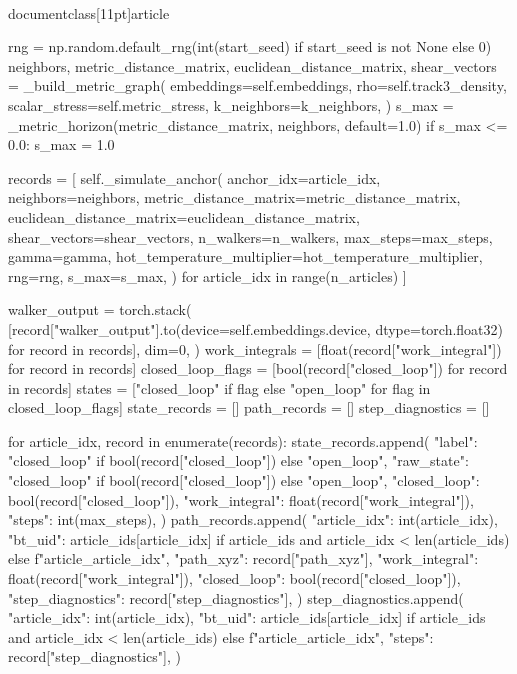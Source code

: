 \\documentclass[11pt]{article}
\begin{document}
\begin{CodeBlock}
        rng = np.random.default_rng(int(start_seed) if start_seed is not None else 0)
        neighbors, metric_distance_matrix, euclidean_distance_matrix, shear_vectors = _build_metric_graph(
            embeddings=self.embeddings,
            rho=self.track3_density,
            scalar_stress=self.metric_stress,
            k_neighbors=k_neighbors,
        )
        s_max = _metric_horizon(metric_distance_matrix, neighbors, default=1.0)
        if s_max <= 0.0:
            s_max = 1.0

        records = [
            self._simulate_anchor(
                anchor_idx=article_idx,
                neighbors=neighbors,
                metric_distance_matrix=metric_distance_matrix,
                euclidean_distance_matrix=euclidean_distance_matrix,
                shear_vectors=shear_vectors,
                n_walkers=n_walkers,
                max_steps=max_steps,
                gamma=gamma,
                hot_temperature_multiplier=hot_temperature_multiplier,
                rng=rng,
                s_max=s_max,
            )
            for article_idx in range(n_articles)
        ]

        walker_output = torch.stack(
            [record["walker_output"].to(device=self.embeddings.device, dtype=torch.float32) for record in records],
            dim=0,
        )
        work_integrals = [float(record["work_integral"]) for record in records]
        closed_loop_flags = [bool(record["closed_loop"]) for record in records]
        states = ["closed_loop" if flag else "open_loop" for flag in closed_loop_flags]
        state_records = []
        path_records = []
        step_diagnostics = []

        for article_idx, record in enumerate(records):
            state_records.append(
                {
                    "label": "closed_loop" if bool(record["closed_loop"]) else "open_loop",
                    "raw_state": "closed_loop" if bool(record["closed_loop"]) else "open_loop",
                    "closed_loop": bool(record["closed_loop"]),
                    "work_integral": float(record["work_integral"]),
                    "steps": int(max_steps),
                }
            )
            path_records.append(
                {
                    "article_idx": int(article_idx),
                    "bt_uid": article_ids[article_idx] if article_ids and article_idx < len(article_ids) else f"article_{article_idx}",
                    "path_xyz": record["path_xyz"],
                    "work_integral": float(record["work_integral"]),
                    "closed_loop": bool(record["closed_loop"]),
                    "step_diagnostics": record["step_diagnostics"],
                }
            )
            step_diagnostics.append(
                {
                    "article_idx": int(article_idx),
                    "bt_uid": article_ids[article_idx] if article_ids and article_idx < len(article_ids) else f"article_{article_idx}",
                    "steps": record["step_diagnostics"],
                }
            )


\end{CodeBlock}
\end{document}
